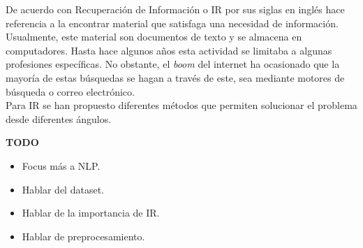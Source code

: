 De acuerdo con \cite{IR-book} Recuperación de Información o IR por sus siglas en inglés hace referencia a la encontrar material que satisfaga una necesidad de información. Usualmente, este material son documentos de texto y se almacena en computadores. Hasta hace algunos años esta actividad se limitaba a algunas profesiones específicas. No obstante, el \textit{boom} del internet ha ocasionado que la mayoría de estas búsquedas se hagan a través de este, sea mediante motores de búsqueda o correo electrónico.\\

Para IR se han propuesto diferentes métodos que permiten solucionar el problema desde diferentes ángulos.

\textbf{TODO}
\begin{itemize}
    \item Focus más a NLP.
    \item Hablar del dataset.
    \item Hablar de la importancia de IR.
    \item Hablar de preprocesamiento.
\end{itemize}
